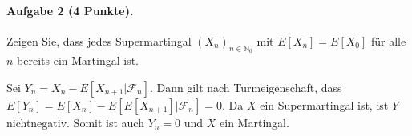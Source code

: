\documentclass{article}
\begin{document}
%
\paragraph{Aufgabe 2 \textnormal{(4 Punkte)}.}
Zeigen Sie, dass jedes Supermartingal $(X_n)_{n\in\mathbb{N}_0}$ mit $E[X_n]=E[X_0]$ für alle $n$ bereits ein Martingal ist.

Sei $Y_n=X_n-E[X_{n+1}|\mathscr{F}_n]$.
Dann gilt nach Turmeigenschaft, dass $E[Y_n]=E[X_n]-E[E[X_{n+1}]|\mathscr{F}_n]=0$.
Da $X$ ein Supermartingal ist, ist $Y$ nichtnega\-tiv.
Somit ist auch $Y_n=0$ und $X$ ein Martingal.

\end{document}
